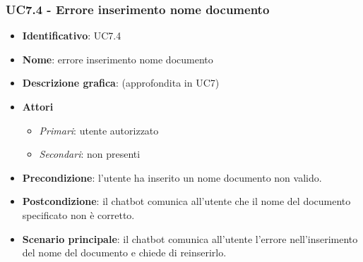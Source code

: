 \subsubsection{UC7.4 - Errore inserimento nome documento}
\begin{itemize}
    \item \textbf{Identificativo}: UC7.4
    \item \textbf{Nome}: errore inserimento nome documento
    \item \textbf{Descrizione grafica}: (approfondita in UC7)
    \item \textbf{Attori}
 \begin{itemize} 
    \item \textit{Primari}: utente autorizzato
    \item \textit{Secondari}: non presenti
 \end{itemize}
 \item \textbf{Precondizione}: l'utente ha inserito un nome documento non valido.
 \item \textbf{Postcondizione}:  il chatbot comunica all'utente che il nome del documento specificato non è corretto.
 \item \textbf{Scenario principale}: il chatbot comunica all'utente l'errore nell'inserimento del nome del documento e chiede di reinserirlo.
\end{itemize}
\newpage